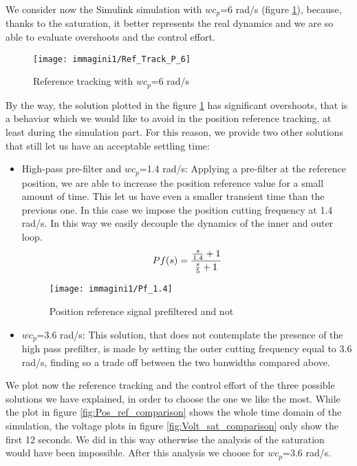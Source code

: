\par 
We consider now the Simulink simulation with $wc_{p} $=6 rad/s (figure \ref{fig:Ref_Track_P_6}), because, thanks to the saturation, it better represents the real dynamics and we are so able to evaluate overshoots and the control effort.
\begin{figure}[h]
	\centering
	\texttt{[image: immagini1/Ref\_Track\_P\_6]}
	\caption{Reference tracking with $wc_{p} $=6 rad/s }
	\label{fig:Ref_Track_P_6}
\end{figure}
By the way, the solution plotted in the figure \ref{fig:Ref_Track_P_6} has significant overshoots, that is a behavior which we would like to avoid in the position reference tracking, at least during the simulation part. For this reason, we provide two other solutions that still let us have an acceptable settling time:
\begin{itemize}
	\item High-pass pre-filter  and $wc_{p} $=1.4 rad/s:
	\newline
	Applying a pre-filter at the reference position, we are able to increase the position reference value for a small amount of time. This let us have even a smaller transient time than the previous one.
	In this case we impose the position cutting frequency at 1.4 rad/s. In this way we easily decouple the dynamics of the inner and outer loop. 
	\[
	\centering
	Pf(s)=
	\frac{\frac{s}{1.4}+1}{\frac{s}{5}+1}
	\]
	\begin{figure}[h]
		\centering
		\texttt{[image: immagini1/Pf\_1.4]}
		\caption{Position reference signal prefiltered and not }
	\end{figure}
\item 	$wc_{p} $=3.6 rad/s:
\newline This solution, that does not contemplate the presence of the high pass prefilter, is made by setting the outer cutting frequency equal to 3.6 rad/s, finding so a trade off between the two banwidths compared above.	
\end{itemize}

\par 
We plot now the reference tracking and the control effort of the three possible solutions we have explained, in order to choose the one we like the most. While the plot in figure \ref{fig:Pos_ref_comparison} shows the whole time domain of the simulation, the voltage plots in figure  \ref{fig:Volt_sat_comparison} only show the first 12 seconds. We did in this way otherwise the analysis of the saturation would have been impossible. After this analysis we choose for $wc_{p} $=3.6 rad/s.

